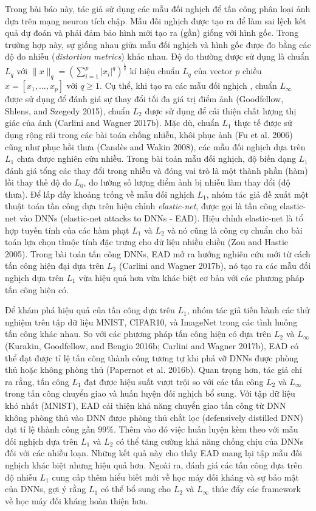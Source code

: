 Trong bài báo này, tác giả sử dụng các mẫu đối nghịch để tấn công phân loại ảnh dựa trên 
mạng neuron tích chập. Mẫu đối nghịch được tạo ra để làm sai lệch kết quả dự đoán và phải đảm bảo
hình mới tạo ra (gần) giống với hình gốc. Trong trường hợp này, sự giống nhau giữa mẫu đối nghịch và hình gốc được đo bằng các độ đo nhiễu (\textit{distortion metrics}) khác nhau.
Độ đo thường được sử dụng là chuẩn $L_q$ 
với $\lVert x \rVert_q = \left( \sum_{i=1}^p |x_i|^q \right)^{\frac{1}{q}}$ kí hiệu chuẩn $L_q$
của vector $p$ chiều $x = [x_1, ..., x_p]$ với $q \geq 1$. Cụ thể, khi tạo ra các mẫu đối nghịch
, chuẩn $L_{\infty}$ được sử dụng để đánh giá sự thay đổi tối đa giá trị điểm ảnh (Goodfellow, 
Shlens, and Szegedy 2015), chuẩn $L_2$ được sử dụng để cải thiện chất lượng thị giác của 
ảnh (Carlini and Wagner 2017b). Mặc dù, chuẩn $L_1$ thực tế được sử dụng rộng rãi 
trong các bài toán chống nhiễu, khôi phục ảnh (Fu et al. 2006) cũng như phục hồi thưa (Candès and Wakin 2008), các mẫu đối nghịch dựa trên $L_1$ chưa được nghiên cứu nhiều. Trong bài toán mẫu đối nghịch,
độ biến dạng $L_1$ đánh giá tổng các thay đổi trong nhiễu và đóng vai trò là một thành phần
(hàm) lồi thay thế độ đo $L_0$, đo lường số lượng điểm ảnh bị nhiễu làm thay đổi (độ thưa). Để lấp đầy khoảng trống về mẫu đối nghịch $L_1$, nhóm tác giả đề xuất một thuật toán tấn công dựa trên hiệu chỉnh \textit{elastic-net}, được 
gọi là tấn công elastic-net vào DNNs (elastic-net attacks to DNNs - EAD). Hiệu chỉnh 
elastic-net là tổ hợp tuyến tính của các hàm phạt $L_1$ và $L_2$ và nó cũng là công cụ 
chuẩn cho bài toán lựa chọn thuộc tính đặc trưng cho dữ liệu nhiều chiều (Zou and Hastie 2005). 
Trong bài toán tấn công DNNs, EAD mở ra hướng nghiên cứu mới từ cách tấn công hiện đại dựa trên 
$L_2$ (Carlini and Wagner 2017b), nó tạo ra các mẫu đối nghịch dựa trên $L_1$ vừa hiệu quả hơn vừa khác biệt cơ bản với các phương pháp tấn công hiện có. 

Để khám phá hiệu quả của tấn công dựa trên $L_1$, nhóm tác giả tiến hành các thử nghiệm trên tập 
dữ liệu MNIST, CIFAR10, và ImageNet trong các tình huống tấn công khác nhau. So với các 
phương pháp tấn công hiện có dựa trên $L_2$ và $L_{\infty}$ (Kurakin, Goodfellow, and 
Bengio 2016b; Carlini and Wagner 2017b), EAD có thể đạt được tỉ lệ tấn công thành công tương 
tự khi phá vỡ DNNs được phòng thủ hoặc không phòng thủ (Papernot et al. 2016b). Quan trọng 
hơn, tác giả chỉ ra rằng, tấn công $L_1$ đạt được hiệu suất vượt trội so với các tấn
công $L_2$ và $L_{\infty}$ trong tấn công chuyển giao và huấn luyện đối nghịch bổ sung. Với tập dữ liệu khó nhất (MNIST), EAD cải thiện khả năng chuyển 
giao tấn công từ DNN không phòng thủ vào DNN được phòng thủ chắt lọc (defensively distilled DNN) đạt tỉ lệ thành công gần $99\%$. Thêm vào 
đó việc huấn luyện kèm theo với mẫu đối nghịch dựa trên $L_1$ và $L_2$ có thể tăng cường khả 
năng chống chịu của DNNs đối với các nhiễu loạn. Những kết quả này cho thấy EAD mang lại tập 
mẫu đối nghịch khác biệt nhưng hiệu quả hơn. Ngoài ra, đánh giá các tấn công dựa trên 
độ nhiễu $L_1$ cung cấp thêm hiểu biết mới về học máy đối kháng và sự bảo mật của DNNs, gợi 
ý rằng $L_1$ có thể bổ sung cho $L_2$ và $L_{\infty}$ thúc đẩy các framework về học máy đối 
kháng hoàn thiện hơn.
